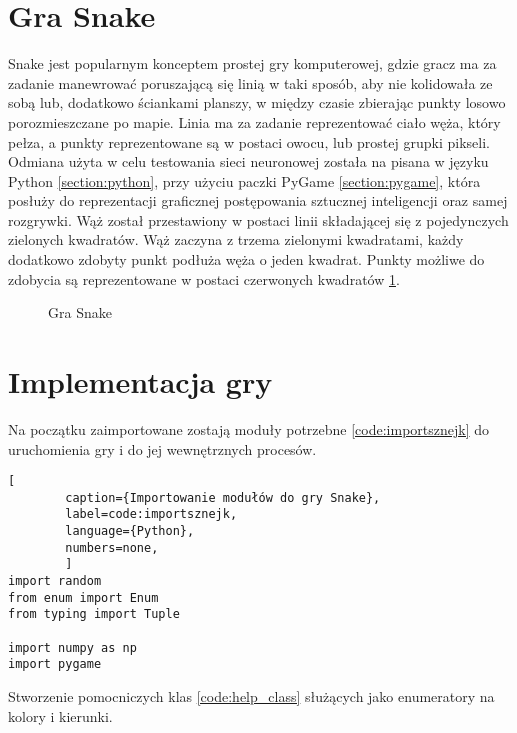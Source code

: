 


\section{Gra Snake}

Snake \cite{SnakeGame} jest popularnym konceptem prostej gry komputerowej, gdzie gracz ma za zadanie manewrować poruszającą się linią w taki sposób, aby nie kolidowała ze sobą lub, dodatkowo ściankami planszy, w między czasie zbierając punkty losowo porozmieszczane po mapie. Linia ma za zadanie reprezentować ciało węża, który pełza, a punkty reprezentowane są w postaci owocu, lub prostej grupki pikseli.
Odmiana użyta w celu testowania sieci neuronowej została na pisana w języku Python \ref{section:python}, przy użyciu paczki PyGame \ref{section:pygame}, która posłuży do reprezentacji graficznej postępowania sztucznej inteligencji oraz samej rozgrywki.
Wąż został przestawiony w postaci linii składającej się z pojedynczych zielonych kwadratów. Wąż zaczyna z trzema zielonymi kwadratami, każdy dodatkowo zdobyty punkt podłuża węża o jeden kwadrat. Punkty możliwe do zdobycia są reprezentowane w postaci czerwonych kwadratów \ref{img:snake_game}.

\begin{figure}[h!]
    \centering
    \caption{Gra Snake}
    \label{img:snake_game}
\end{figure}


\section{Implementacja gry}


Na początku zaimportowane zostają moduły potrzebne \ref{code:importsznejk} do uruchomienia gry i do jej wewnętrznych procesów.


\begin{onepage}
    \begin{lstlisting}[
        caption={Importowanie modułów do gry Snake},
        label=code:importsznejk,
        language={Python},
        numbers=none,
        ]
import random
from enum import Enum
from typing import Tuple

import numpy as np
import pygame
    \end{lstlisting}
\end{onepage}



Stworzenie pomocniczych klas \ref{code:help_class} służących jako enumeratory na kolory i kierunki.


